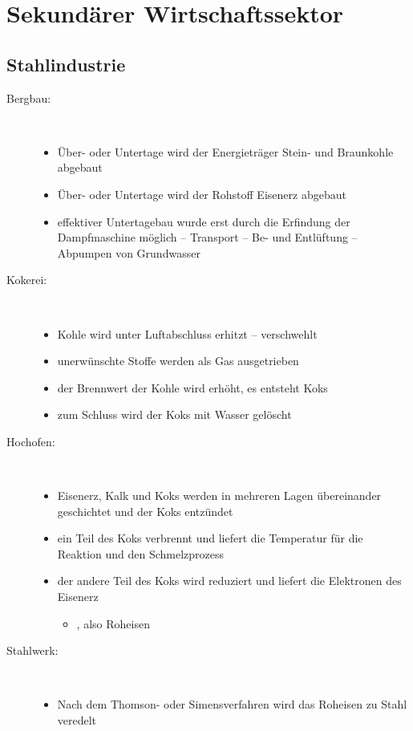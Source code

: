 \section{Sekundärer Wirtschaftssektor}
\subsection{Stahlindustrie}

\begin{description}
	\item[Bergbau:]~
	\begin{itemize}
		\item Über- oder Untertage wird der Energieträger Stein- und Braunkohle abgebaut
		\item Über- oder Untertage wird der Rohstoff Eisenerz abgebaut
		\item effektiver Untertagebau wurde erst durch die Erfindung der Dampfmaschine möglich
			-- Transport -- Be- und Entlüftung -- Abpumpen von Grundwasser
	\end{itemize}
	\item[Kokerei:]~
	\begin{itemize}
		\item Kohle wird unter Luftabschluss erhitzt -- verschwehlt
		\item unerwünschte Stoffe werden als Gas ausgetrieben
		\item der Brennwert der Kohle wird erhöht, es entsteht Koks
		\item zum Schluss wird der Koks mit Wasser gelöscht
	\end{itemize}
	\item[Hochofen:]~
	\begin{itemize}
		\item Eisenerz, Kalk und Koks werden in mehreren Lagen übereinander geschichtet und der Koks entzündet
		\item ein Teil des Koks verbrennt und liefert die Temperatur für die Reaktion und den Schmelzprozess
		\item der andere Teil des Koks wird reduziert und liefert die Elektronen des Eisenerz 
		\begin{itemize}
			\item {}, also Roheisen
		\end{itemize}
	\end{itemize}
	\item[Stahlwerk:]~
	\begin{itemize}
		\item Nach dem Thomson- oder Simensverfahren wird das Roheisen zu Stahl veredelt

\end{itemize}
\end{description}
